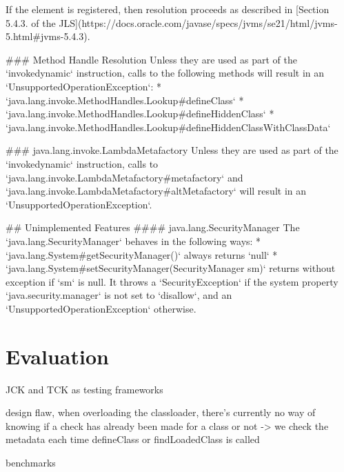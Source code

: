 If the element is registered, then resolution proceeds as described in 
[Section 5.4.3. of the JLS](https://docs.oracle.com/javase/specs/jvms/se21/html/jvms-5.html#jvms-5.4.3).

### Method Handle Resolution
Unless they are used as part of the `invokedynamic` instruction, calls to the following methods 
will result in an `UnsupportedOperationException`:
* `java.lang.invoke.MethodHandles.Lookup#defineClass`
* `java.lang.invoke.MethodHandles.Lookup#defineHiddenClass`
* `java.lang.invoke.MethodHandles.Lookup#defineHiddenClassWithClassData`

### java.lang.invoke.LambdaMetafactory
Unless they are used as part of the `invokedynamic` instruction, calls to `java.lang.invoke.LambdaMetafactory#metafactory` 
and `java.lang.invoke.LambdaMetafactory#altMetafactory` will result in an `UnsupportedOperationException`.


## Unimplemented Features
#### java.lang.SecurityManager
The `java.lang.SecurityManager` behaves in the following ways:
* `java.lang.System#getSecurityManager()` always returns `null`
* `java.lang.System#setSecurityManager(SecurityManager sm)` returns without exception if `sm` is null. 
It throws a `SecurityException` if the system property `java.security.manager` is not set to `disallow`, and an 
`UnsupportedOperationException` otherwise.



\chapter{Evaluation}
JCK and TCK as testing frameworks


design flaw, when overloading the classloader, there's currently no way of knowing if a check has already been made for a class or not -> we check the metadata each time defineClass or findLoadedClass is called

benchmarks
